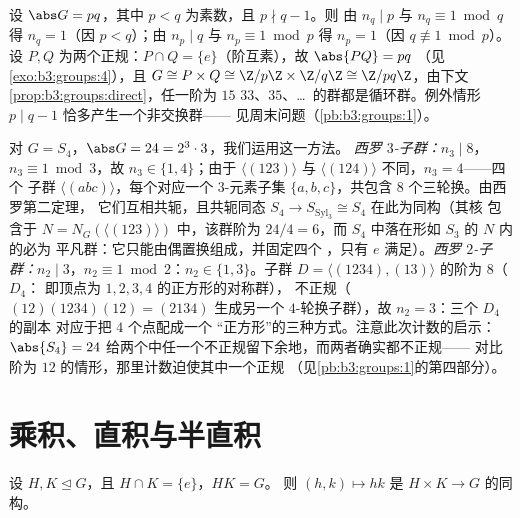 \begin{example}\label{ex:b3:groups:pq}
设 $\abs G = pq$，其中 $p < q$ 为素数，且 $p \nmid q - 1$。则
由 $n_q \mid p$ 与 $n_q \equiv 1 \bmod q$ 得 $n_q = 1$（因 $p <
q$）；由 $n_p \mid q$ 与 $n_p \equiv 1 \bmod p$ 得 $n_p = 1$（因 $q
\not\equiv 1 \bmod p$）。设 $P, Q$ 为两个正规：$P
\cap Q = \{e\}$（阶互素），故 $\abs{PQ} = pq$
（见\cref{exo:b3:groups:4}），且 $G \cong P \times Q \cong \Z/p\Z
\times \Z/q\Z \cong \Z/pq\Z$，由下文
\cref{prop:b3:groups:direct}，任一阶为 $15$
$33$、$35$、\dots\ 的群都是循环群。例外情形 $p \mid q - 1$
恰多产生一个非交换群——
见周末问题（\cref{pb:b3:groups:1}）。
\end{example}

\begin{example}[西罗子群的完整计数：$S_4$]
\label{ex:b3:groups:s4sylow}
对 $G = S_4$，$\abs G = 24 = 2^3\cdot3$，我们运用这一方法。
\emph{西罗 $3$-子群：}$n_3 \mid 8$，$n_3 \equiv 1 \bmod 3$，故 $n_3
\in \{1, 4\}$；由于 $\langle(123)\rangle$ 与
$\langle(124)\rangle$ 不同，$n_3 = 4$——四个
子群 $\langle(abc)\rangle$，每个对应一个 $3$-元素子集
$\{a, b, c\}$，共包含 $8$ 个三轮换。由西罗第二定理，
它们互相共轭，且共轭同态 $S_4 \to
S_{\mathrm{Syl}_3} \cong S_4$ 在此为同构（其核
包含于 $N = N_G(\langle(123)\rangle)$ 中，该群阶为 $24/4 =
6$，而 $S_4$ 中落在形如 $S_3$ 的 $N$ 内的必为
平凡群：它只能由偶置换组成，并固定四个
，只有 $e$ 满足）。\emph{西罗 $2$-子群：}$n_2 \mid 3$，$n_2
\equiv 1 \bmod 2$：$n_2 \in \{1, 3\}$。子群 $D =
\langle(1234), (13)\rangle$ 的阶为 $8$（ $D_4$：
即顶点为 $1, 2, 3, 4$ 的正方形的对称群），
不正规（$(12)(1234)(12) = (2134)$ 生成另一个
$4$-轮换子群），故 $n_2 = 3$：三个 $D_4$ 的副本
对应于把 $4$ 个点配成一个
“正方形”的三种方式。注意此次计数的启示：$\abs{S_4} = 24$
给两个中任一个不正规留下余地，而两者确实都不正规——
对比阶为 $12$ 的情形，那里计数迫使其中一个正规
（见\cref{pb:b3:groups:1}的第四部分）。
\end{example}

\section{乘积、直积与半直积}

\begin{proposition}[直积的识别]\label{prop:b3:groups:direct}
设 $H, K \trianglelefteq G$，且 $H \cap K = \{e\}$，$HK = G$。
则 $(h,k) \mapsto hk$ 是 $H \times K \to
G$ 的同构。
\end{proposition}

